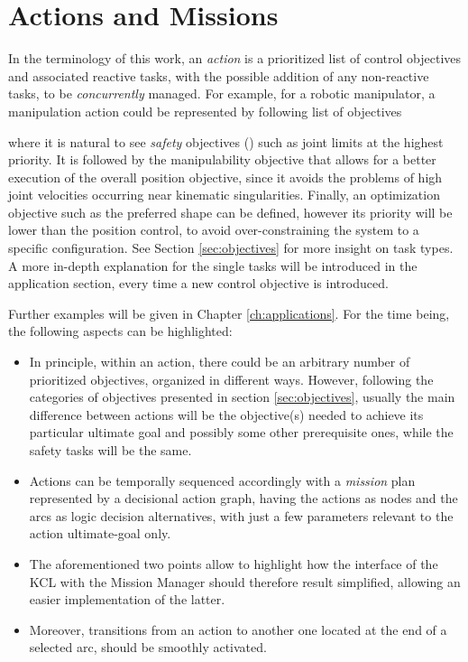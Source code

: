 \section{Actions and Missions}\label{sec:action}
In the terminology of this work, an \emph{action} is a prioritized list of control objectives and associated reactive tasks, with the possible addition of any non-reactive tasks, to be \emph{concurrently} managed. For example, for a robotic manipulator, a manipulation action could be represented by following list of objectives
\begin{tasklist}
	\item \JointLimitsTask
	\item \ManipTask
	\item \ToolFramePosTask
	\item \ToolFrameOriTask
	\item \ArmShapeTask
\end{tasklist}%
%
where it is natural to see \emph{safety} objectives (\safetyTask) such as joint limits at the highest priority. It is followed by the manipulability objective that allows for a better execution of the overall position objective, since it avoids the problems of high joint velocities occurring near kinematic singularities. Finally, an optimization objective such as the preferred shape can be defined, however its priority will be lower than the position control, to avoid over-constraining the system to a specific configuration. See Section \ref{sec:objectives} for more insight on task types. A more in-depth explanation for the single tasks will be introduced in the application section, every time a new control objective is introduced.

Further examples will be given in Chapter \ref{ch:applications}. For the time being, the following aspects can be highlighted:
\begin{itemize}
	\item In principle, within an action, there could be an arbitrary number of prioritized objectives, organized in different ways. However, following the categories of objectives presented in section \ref{sec:objectives}, usually the main difference between actions will be the objective(s) needed to achieve its particular ultimate goal and possibly some other prerequisite ones, while the safety tasks will be the same.
	\item Actions can be temporally sequenced accordingly with a \emph{mission} plan represented by a decisional action graph, having the actions as nodes and the arcs as logic decision alternatives, with just a few parameters relevant to the action ultimate-goal only.
	\item The aforementioned two points allow to highlight how the interface of the KCL with the Mission Manager should therefore result simplified, allowing an easier implementation of the latter.
	\item Moreover, transitions from an action to another one located at the end of a selected arc, should be smoothly activated.
\end{itemize}


